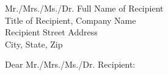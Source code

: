 \thispagestyle{emptyletter}
Mr./Mrs./Ms./Dr. Full Name of Recipient\\
Title of Recipient, Company Name\\
Recipient Street Address\\
City, State, Zip

\vspace*{0.1in}

Dear Mr./Mrs./Ms./Dr. Recipient:
